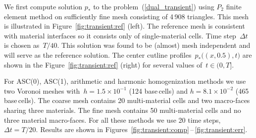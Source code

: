We first compute solution $p_*$ to the problem~(\ref{dual_transient}) using $P_2$ finite element method on sufficiently fine mesh consisting of 4\,908 triangles. This mesh is illustrated in Figure~\ref{fig:transient:ref} (left). The reference mesh is consistent with material interfaces so it consists only of single-material cells. Time step~$\Delta t$ is chosen as~$T / 40$. This solution was found to be (almost) mesh independent and will serve as the  reference solution. The center cutline profiles~$p_*\big((x,0.5), t\big)$   are shown in the Figure~\ref{fig:transient:ref} (right) for several values of~$t \in (0, T]$.
	
For ASC(0), ASC(1), arithmetic and harmonic homogenization methods we use two Voronoi meshes with~$h = 1.5 \times 10^{-1}$ (124 base\,cells) and $h = 8.1 \times 10^{-2}$ (465 base\,cells).
The coarse mesh contains 20 multi-material cells and two macro-faces sharing three materials. The fine mesh contains 50 multi-material cells and no three material macro-faces. For all these methods we use 20 time steps, $\Delta t = T / 20$. Results are shown in Figures~\ref{fig:transient:comp}\,--\,\ref{fig:transient:err}.


